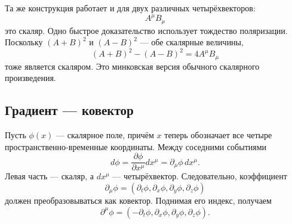 \begin{classroomqa}
\end{classroomqa}

Та же конструкция работает и для двух различных четырёхвекторов:
\begin{equation}
A^\mu B_\mu
\end{equation}
это скаляр. Одно быстрое доказательство использует тождество поляризации. Поскольку
\((A+B)^2\) и \((A-B)^2\) — обе скалярные величины,
\begin{equation}
(A+B)^2-(A-B)^2=4A^\mu B_\mu
\end{equation}
тоже является скаляром. Это минковская версия обычного скалярного произведения.

\begin{classroomqa}
\end{classroomqa}

\subsection{Градиент — ковектор}

Пусть \(\phi(x)\) — скалярное поле, причём \(x\) теперь обозначает все четыре
пространственно-временные координаты. Между соседними событиями
\begin{equation}
d\phi
=
\frac{\partial\phi}{\partial x^\mu}dx^\mu
=
\partial_\mu\phi\,dx^\mu.
\label{eq:sr5-dphi}
\end{equation}
Левая часть — скаляр, а \(dx^\mu\) — четырёхвектор. Следовательно, коэффициент
\begin{equation}
\partial_\mu\phi
=
\left(
\partial_t\phi,
\partial_x\phi,
\partial_y\phi,
\partial_z\phi
\right)
\label{eq:sr5-gradient-lower}
\end{equation}
должен преобразовываться как ковектор. Поднимая его индекс, получаем
\begin{equation}
\partial^\mu\phi
=
\left(
-\partial_t\phi,
\partial_x\phi,
\partial_y\phi,
\partial_z\phi
\right).
\label{eq:sr5-gradient-upper}
\end{equation}


